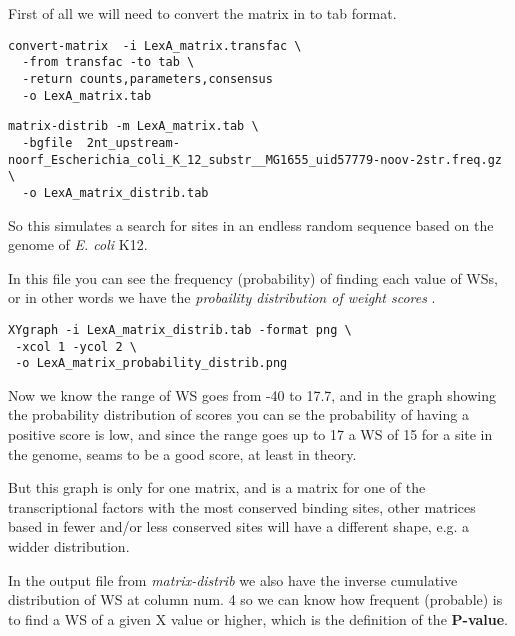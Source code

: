 First of all we will need to convert the matrix in to tab format.

{\color{Blue} 
\begin{footnotesize} 
\begin{verbatim}
convert-matrix  -i LexA_matrix.transfac \
  -from transfac -to tab \
  -return counts,parameters,consensus 
  -o LexA_matrix.tab
\end{verbatim} 
\end{footnotesize}
}


{\color{Blue} 
\begin{footnotesize}
\begin{verbatim}
matrix-distrib -m LexA_matrix.tab \
  -bgfile  2nt_upstream-noorf_Escherichia_coli_K_12_substr__MG1655_uid57779-noov-2str.freq.gz \
  -o LexA_matrix_distrib.tab
\end{verbatim} 
\end{footnotesize} 
}

So this simulates a search for sites in an endless random sequence
based on the genome of \textit{E. coli} K12.

In this file you can see the frequency (probability) of finding each
value of WSs, or in other words we have the \textit{ probaility
  distribution of weight scores }.

{\color{Blue} 
\begin{footnotesize}
\begin{verbatim}
XYgraph -i LexA_matrix_distrib.tab -format png \
 -xcol 1 -ycol 2 \
 -o LexA_matrix_probability_distrib.png
\end{verbatim} 
\end{footnotesize} }

Now we know the range of WS goes from -40 to 17.7, and in the graph
showing the probability distribution of scores you can se the
probability of having a positive score is low, and since the range
goes up to 17 a WS of 15 for a site in the genome, seams to be a good
score, at least in theory.

But this graph is only for one matrix, and is a matrix for one of the
transcriptional factors with the most conserved binding sites, other
matrices based in fewer and/or less conserved sites will have a
different shape, e.g. a widder distribution.

In the output file from \textit{matrix-distrib} we also have the
inverse cumulative distribution of WS at column num. 4 so we can know
how frequent (probable) is to find a WS of a given X value or higher,
which is the definition of the \textbf{P-value}.

